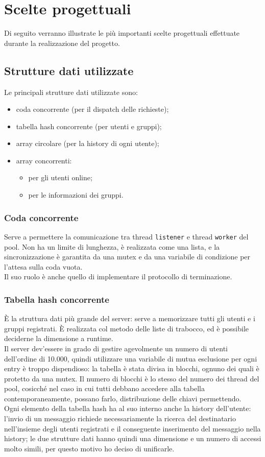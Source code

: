 
\section{Scelte progettuali}
Di seguito verranno illustrate le più importanti scelte progettuali effettuate durante la realizzazione del progetto.
 
\subsection{Strutture dati utilizzate}
Le principali strutture dati utilizzate sono:
\begin{itemize}
	\item coda concorrente (per il dispatch delle richieste);
	\item tabella hash concorrente (per utenti e gruppi);
	\item array circolare (per la history di ogni utente);
	\item array concorrenti:
	\begin{itemize}
		\item per gli utenti online;
		\item per le informazioni dei gruppi.
	\end{itemize}
\end{itemize}

\subsubsection{Coda concorrente}
Serve a permettere la comunicazione tra thread \texttt{listener} e thread \texttt{worker} del pool. Non ha un limite di lunghezza, è realizzata come una lista, e la sincronizzazione è garantita da una mutex e da una variabile di condizione per l'attesa sulla coda vuota.\\
Il suo ruolo è anche quello di implementare il protocollo di terminazione.

\subsubsection{Tabella hash concorrente}
È la struttura dati più grande del server: serve a memorizzare tutti gli utenti e i gruppi registrati. È realizzata col metodo delle liste di trabocco, ed è possibile deciderne la dimensione a runtime.\\
Il server dev'essere in grado di gestire agevolmente un numero di utenti dell'ordine di 10.000, quindi utilizzare una variabile di mutua esclusione per ogni entry è troppo dispendioso: la tabella è stata divisa in blocchi, ognuno dei quali è protetto da una mutex. Il numero di blocchi è lo stesso del numero dei thread del pool, cosicché nel caso in cui tutti debbano accedere alla tabella contemporaneamente, possano farlo, distribuzione delle chiavi permettendo.\\
Ogni elemento della tabella hash ha al suo interno anche la history dell'utente: l'invio di un messaggio richiede necessariamente la ricerca del destinatario nell'insieme degli utenti registrati e il conseguente inserimento del messaggio nella history; le due strutture dati hanno quindi una dimensione e un numero di accessi molto simili, per questo motivo ho deciso di unificarle.

